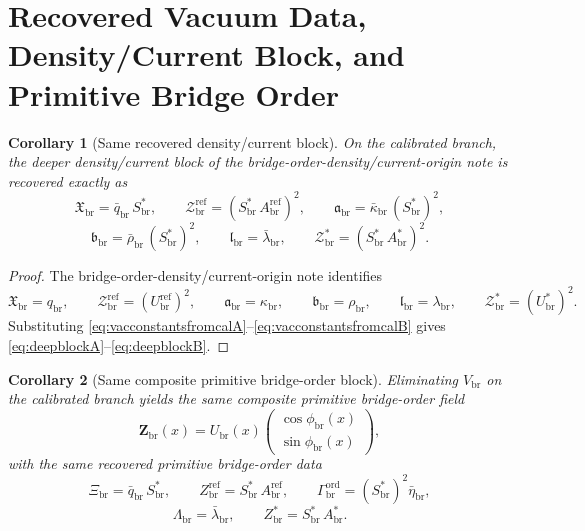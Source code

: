 \documentclass[11pt]{article}
\newcommand{\RespOrderField}{\bm Z_{\mathrm{br}}}
\newcommand{\RespOrderRef}{Z_{\mathrm{br}}^{\mathrm{ref}}}
\newcommand{\RespOrderEq}{Z_{\mathrm{br}}^{\ast}}
\newcommand{\RespOrderReadout}{\Xi_{\mathrm{br}}}
\newcommand{\RespOrderStiff}{\Gamma_{\mathrm{br}}^{\mathrm{ord}}}
\newcommand{\RespOrderQuartic}{\Lambda_{\mathrm{br}}}
\newcommand{\RespDeepDensityRef}{\mathcal Z_{\mathrm{br}}^{\mathrm{ref}}}
\newcommand{\RespDeepDensityEq}{\mathcal Z_{\mathrm{br}}^{\ast}}
\newcommand{\RespDeepReadout}{\mathfrak X_{\mathrm{br}}}
\newcommand{\RespDeepTrack}{\mathfrak a_{\mathrm{br}}}
\newcommand{\RespDeepRelax}{\mathfrak b_{\mathrm{br}}}
\newcommand{\RespDeepWell}{\mathfrak l_{\mathrm{br}}}
\newcommand{\RespVacAmp}{U_{\mathrm{br}}}
\newcommand{\RespVacRef}{U_{\mathrm{br}}^{\mathrm{ref}}}
\newcommand{\RespVacEq}{U_{\mathrm{br}}^{\ast}}
\newcommand{\RespVacPhase}{\phi_{\mathrm{br}}}
\newcommand{\RespVacCarrier}{V_{\mathrm{br}}}
\newcommand{\RespVacReadout}{q_{\mathrm{br}}}
\newcommand{\RespVacCov}{\kappa_{\mathrm{br}}}
\newcommand{\RespVacRelax}{\rho_{\mathrm{br}}}
\newcommand{\RespVacWell}{\lambda_{\mathrm{br}}}
\newcommand{\RespScaleEq}{S_{\mathrm{br}}^{\ast}}
\newcommand{\RespScaleAmpRef}{A_{\mathrm{br}}^{\mathrm{ref}}}
\newcommand{\RespScaleAmpEq}{A_{\mathrm{br}}^{\ast}}
\newcommand{\RespScaleReadout}{\bar q_{\mathrm{br}}}
\newcommand{\RespScaleCov}{\bar\kappa_{\mathrm{br}}}
\newcommand{\RespScaleRelax}{\bar\rho_{\mathrm{br}}}
\newcommand{\RespScaleWell}{\bar\lambda_{\mathrm{br}}}
\newcommand{\RespScaleIso}{\bar\eta_{\mathrm{br}}}
\newtheorem{corollary}{Corollary}
\begin{document}
\section{Recovered Vacuum Data, Density/Current Block, and Primitive Bridge Order}

\begin{corollary}[Same recovered density/current block]
\label{cor:deepblock}
On the calibrated branch, the deeper density/current block of the bridge-order-density/current-origin note is recovered exactly as
\begin{equation}
\RespDeepReadout=\RespScaleReadout\,\RespScaleEq,
\qquad
\RespDeepDensityRef=(\RespScaleEq\,\RespScaleAmpRef)^2,
\qquad
\RespDeepTrack=\RespScaleCov\,(\RespScaleEq)^2,
\label{eq:deepblockA}
\end{equation}
\begin{equation}
\RespDeepRelax=\RespScaleRelax\,(\RespScaleEq)^2,
\qquad
\RespDeepWell=\RespScaleWell,
\qquad
\RespDeepDensityEq=(\RespScaleEq\,\RespScaleAmpEq)^2.
\label{eq:deepblockB}
\end{equation}
\end{corollary}

\begin{proof}
The bridge-order-density/current-origin note identifies
\[
\RespDeepReadout=\RespVacReadout,
\qquad
\RespDeepDensityRef=(\RespVacRef)^2,
\qquad
\RespDeepTrack=\RespVacCov,
\qquad
\RespDeepRelax=\RespVacRelax,
\qquad
\RespDeepWell=\RespVacWell,
\qquad
\RespDeepDensityEq=(\RespVacEq)^2.
\]
Substituting \eqref{eq:vacconstantsfromcalA}--\eqref{eq:vacconstantsfromcalB} gives \eqref{eq:deepblockA}--\eqref{eq:deepblockB}.
\end{proof}

\begin{corollary}[Same composite primitive bridge-order block]
\label{cor:orderblock}
Eliminating \(\RespVacCarrier\) on the calibrated branch yields the same composite primitive bridge-order field
\begin{equation}
\RespOrderField(x)
=
\RespVacAmp(x)
\begin{pmatrix}
\cos\RespVacPhase(x)\\
\sin\RespVacPhase(x)
\end{pmatrix},
\label{eq:orderfield}
\end{equation}
with the same recovered primitive bridge-order data
\begin{equation}
\RespOrderReadout=\RespScaleReadout\,\RespScaleEq,
\qquad
\RespOrderRef=\RespScaleEq\,\RespScaleAmpRef,
\qquad
\RespOrderStiff=(\RespScaleEq)^2\RespScaleIso,
\label{eq:orderblockA}
\end{equation}
\begin{equation}
\RespOrderQuartic=\RespScaleWell,
\qquad
\RespOrderEq=\RespScaleEq\,\RespScaleAmpEq.
\label{eq:orderblockB}
\end{equation}
\end{corollary}
\end{document}

